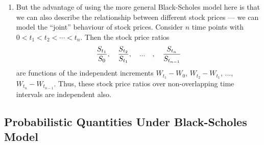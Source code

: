 \begin{enumerate}
\item \label{it:bs-indpt-price-ratios}
But the advantage of using the more general Black-Scholes model here is
that we can also describe the relationship between different stock prices ---
we can model the ``joint'' behaviour of stock prices. Consider \(n\) time
points with \(0<t_1<t_2<\dotsb<t_n\). Then the stock price ratios
\[
\frac{S_{t_1}}{S_{0}},\quad\frac{S_{t_2}}{S_{t_1}},\qqtext{...},\quad\frac{S_{t_n}}{S_{t_{n-1}}}
\]
are functions of the independent increments \(W_{t_1}-W_0\), \(W_{t_2}-W_{t_1}\),
..., \(W_{t_n}-W_{t_{n-1}}\). Thus, these stock price ratios over
non-overlapping time intervals are independent also.
\end{enumerate}
\subsection{Probabilistic Quantities Under Black-Scholes Model}
